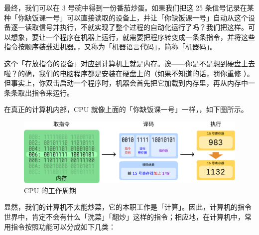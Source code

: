 最终，我们可以在 3 号碗中得到一份番茄炒蛋。如果我们把这 25 条信号记录在某种「你缺饭课一号」可以直接读取的设备上，并让「你缺饭课一号」自动从这个设备逐一读取信号并执行，不就实现了整个过程的自动化运行了吗？我们把这样。可以想象，要让一个程序在机器上运行，就需要把程序转变成一条条指令，并将这些指令按顺序装载进机器。，又称为「机器语言代码」，简称「机器码」。

\begin{note}
  这个「存放指令的设备」对应到计算机上就是内存。诶——你是不是想到硬盘上去啦？的确，我们的电脑程序都是安装在硬盘上的（如果不知道的话，罚你重修 ）。但事实上，你双击启动一个程序时，机器会首先把它加载到内存里，再从内存中一条条取出指令来运行。
\end{note}

在真正的计算机内部，CPU 就像上面的「你缺饭课一号」一样，，如下图所示。

\begin{figure}[htb!]
  \centering
  \includegraphics[width=.9\textwidth]{assets/surpass/CPU_exec.pdf}
  \caption{CPU 的工作周期}
  \label{fig:CPU_exec}
\end{figure}

显然，我们的计算机不太能炒菜，它的本职工作是「计算」。因此，计算机的指令世界中，肯定不会有什么「洗菜」「翻炒」这样的指令；相应地，在计算机中，常用指令按照功能可以分成如下几类：

